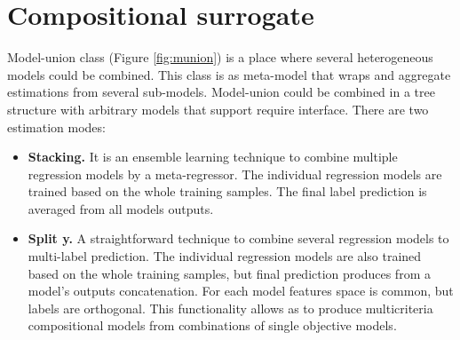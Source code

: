 


\section{Compositional surrogate}
    Model-union class (Figure \ref{fig:munion}) is a place where several heterogeneous models could be combined. This class is as meta-model that wraps and aggregate estimations from several sub-models. Model-union could be combined in a tree structure with arbitrary models that support require interface. There are two estimation modes:
    \begin{itemize}
        \item \textbf{Stacking.} It is an ensemble learning technique to combine multiple regression models by a meta-regressor. The individual regression models are trained based on the whole training samples. The final label prediction is averaged from all models outputs.
        \item \textbf{Split y.} A straightforward technique to combine several regression models to multi-label prediction. The individual regression models are also trained based on the whole training samples, but final prediction produces from a model's outputs concatenation. For each model features space is common, but labels are orthogonal. This functionality allows as to produce multicriteria compositional models from combinations of single objective models.

    \end{itemize}

